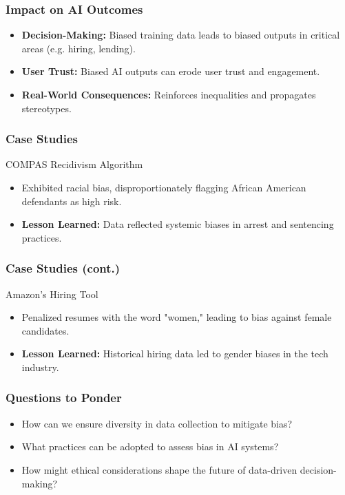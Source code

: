 \documentclass[aspectratio=169]{beamer}
\begin{document}
\begin{frame}[fragile]
    \frametitle{Impact on AI Outcomes}
    \begin{itemize}
        \item \textbf{Decision-Making:} Biased training data leads to biased outputs in critical areas (e.g. hiring, lending).
        \item \textbf{User Trust:} Biased AI outputs can erode user trust and engagement.
        \item \textbf{Real-World Consequences:} Reinforces inequalities and propagates stereotypes.
    \end{itemize}
\end{frame}

\begin{frame}[fragile]
    \frametitle{Case Studies}
    \begin{block}{COMPAS Recidivism Algorithm}
        \begin{itemize}
            \item Exhibited racial bias, disproportionately flagging African American defendants as high risk.
            \item \textbf{Lesson Learned:} Data reflected systemic biases in arrest and sentencing practices.
        \end{itemize}
    \end{block}
\end{frame}

\begin{frame}[fragile]
    \frametitle{Case Studies (cont.)}
    \begin{block}{Amazon's Hiring Tool}
        \begin{itemize}
            \item Penalized resumes with the word "women," leading to bias against female candidates.
            \item \textbf{Lesson Learned:} Historical hiring data led to gender biases in the tech industry.
        \end{itemize}
    \end{block}
\end{frame}

\begin{frame}[fragile]
    \frametitle{Questions to Ponder}
    \begin{itemize}
        \item How can we ensure diversity in data collection to mitigate bias?
        \item What practices can be adopted to assess bias in AI systems?
        \item How might ethical considerations shape the future of data-driven decision-making?
    \end{itemize}
\end{frame}
\end{document}
